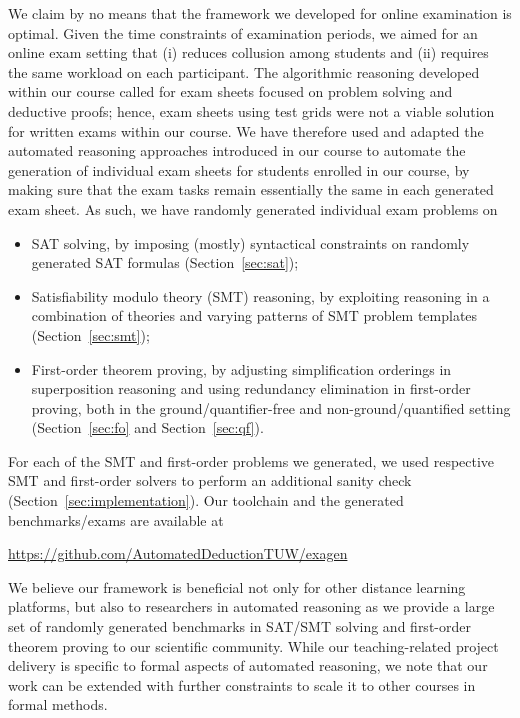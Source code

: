 We claim by no means that the framework we developed for online
examination is optimal.
Given the time constraints of examination periods, we aimed for an
online exam setting that (i) reduces collusion among students and  (ii)
requires the same workload on each participant.
The algorithmic reasoning developed within our
course called for exam sheets focused on problem solving and deductive
proofs; hence, exam sheets using test grids were not a viable solution
for written exams within our course.
We have therefore used and adapted the automated reasoning approaches introduced in our
course to automate the generation of individual exam sheets for
students enrolled in our course, by making sure that the exam tasks
remain essentially the same in each generated exam sheet. As such, we have randomly generated
individual exam problems on 
\begin{itemize}
\item
    SAT solving, by imposing (mostly) syntactical constraints on
    randomly generated SAT formulas (Section~\ref{sec:sat});
    
\item Satisfiability modulo theory (SMT) reasoning, by exploiting reasoning in a combination of theories
  and varying patterns of SMT problem templates
  (Section~\ref{sec:smt});
  
\item First-order theorem proving, by adjusting simplification
  orderings in superposition reasoning and using redundancy elimination
  in first-order proving, both in the ground/quantifier-free 
  and non-ground/quantified setting (Section~\ref{sec:fo}
  and Section~\ref{sec:qf}). 
\end{itemize}

For each of the SMT and first-order problems we generated, we used respective
SMT and first-order solvers to perform an additional sanity check
(Section~\ref{sec:implementation}).
Our toolchain and the generated benchmarks/exams are available at

\begin{center}
  \url{https://github.com/AutomatedDeductionTUW/exagen}
\end{center}

We believe our framework is beneficial not only for other
distance learning platforms, but also to researchers in automated
reasoning as we provide a large set of randomly generated benchmarks
in SAT/SMT solving and first-order theorem proving
to our scientific community.
While our teaching-related project delivery is specific to formal aspects of automated
reasoning, we note that our work can be extended with further
constraints to scale it to other courses in formal methods. 

